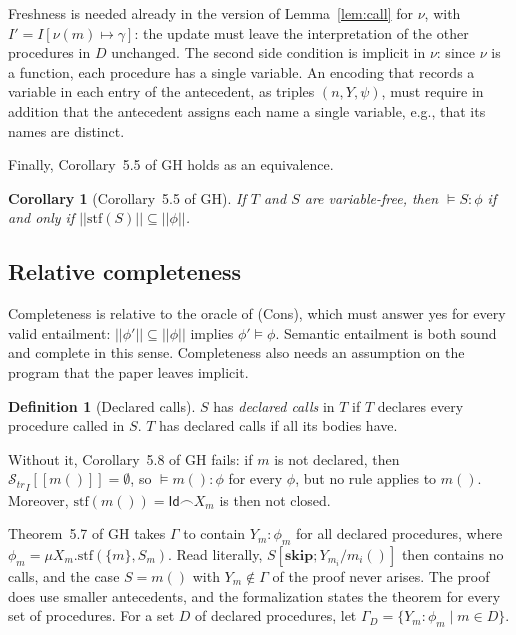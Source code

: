 \documentclass[11pt]{article}
\newcommand{\sem}[1]{[\![ #1 ]\!]}
\newcommand{\fsem}[1]{|\!|#1|\!|}
\newcommand{\Str}{{\mathcal{S}_{\mathit{tr}}}}
\newcommand{\chop}{\smallfrown}
\newcommand{\Id}{\mathsf{Id}}
\newcommand{\stf}{\mathrm{stf}}
\newcommand{\kw}[1]{\mathbf{#1}}
\newcommand{\skipS}{\kw{skip}}
\newcommand{\call}[1]{#1()}
\newcommand{\GH}[1]{#1 of GH}
\theoremstyle{plain}
\newtheorem{corollary}[theorem]{Corollary}
\theoremstyle{definition}
\newtheorem{definition}[theorem]{Definition}
\theoremstyle{remark}
\begin{document}
Freshness is needed already in the version of Lemma~\ref{lem:call} for
$\nu$, with $I' = I[\nu(m) \mapsto \gamma]$: the update must leave the
interpretation of the other procedures in $D$ unchanged. The second side condition is implicit in $\nu$: since $\nu$ is a
function, each procedure has a single variable. An encoding that records a
variable in each entry of the antecedent, as triples $(n, Y, \psi)$, must
require in addition that the antecedent assigns each name a single
variable, e.g., that its names are distinct.

Finally, \GH{Corollary~5.5} holds as an equivalence.

\begin{corollary}[\GH{Corollary~5.5}]\label{cor:strongest}
  If $T$ and $S$ are variable-free, then $\models S : \phi$ if and only if
  $\fsem{\stf(S)} \subseteq \fsem{\phi}$.
\end{corollary}

\subsection{Relative completeness}\label{sec:complete}

Completeness is relative to the oracle of (Cons), which must answer yes for
every valid entailment: $\fsem{\phi'} \subseteq \fsem{\phi}$ implies
$\phi' \models \phi$. Semantic entailment is both sound and complete in
this sense. Completeness also needs an assumption on the program that the
paper leaves implicit.

\begin{definition}[Declared calls]\label{def:declared}
  $S$ has \emph{declared calls} in $T$ if $T$ declares every procedure
  called in $S$. $T$ has declared calls if all its bodies have.
\end{definition}

Without it, \GH{Corollary~5.8} fails: if $m$ is not declared, then
$\Str_I\sem{\call{m}} = \emptyset$, so $\models \call{m} : \phi$ for every
$\phi$, but no rule applies to $\call{m}$. Moreover, $\stf(\call{m}) =
\Id\chop X_m$ is then not closed.

\GH{Theorem~5.7} takes $\Gamma$ to contain $Y_m : \phi_m$ for all declared
procedures, where $\phi_m = \mu X_m.\stf(\{m\}, S_m)$. Read literally,
$S[\skipS;Y_{m_i}/m_i()]$ then contains no calls, and the case $S =
\call{m}$ with $Y_m \notin \Gamma$ of the proof never arises. The proof does
use smaller antecedents, and the formalization states the theorem for
every set of procedures. For a set $D$ of declared procedures, let
$\Gamma_D = \{Y_m : \phi_m \mid m \in D\}$.
\end{document}
